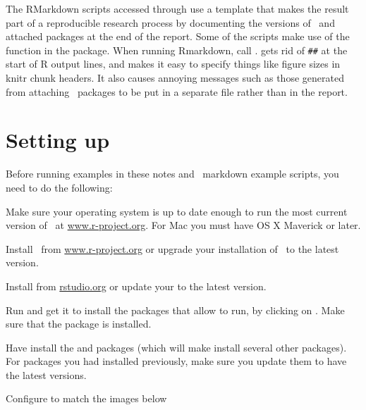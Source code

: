 The RMarkdown scripts accessed through  use a template that makes the
result part of 
a reproducible research process by documenting the versions of \R\ and
attached packages at the end of the report.  Some of the scripts make use of the
 function in the  package. When running
Rmarkdown, call .   gets
rid of \verb|##| at 
the start of R output lines, and makes it easy to specify things like
figure sizes in knitr chunk headers. It also causes annoying messages
such as those generated from attaching \R\ packages to be put in a
separate file  rather than in the report.

\section{Setting up \R}
Before running examples in these notes and \R\ markdown example
scripts, you need to do the following:
\be
\item Make sure your operating system is up to date enough to run the
  most current version of \R\ at \url{www.r-project.org}.  For Mac you
  must have OS X Maverick or later.
\item Install \R\ from \url{www.r-project.org} or upgrade your
  installation of \R\ to the latest version.
\item Install  from \url{rstudio.org} or update your
   to the latest version.
\item Run  and get it to install the packages that allow
   to run, by clicking on .  Make sure that the  package is installed.
\item Have  install the  and  packages
  (which will make  install several other packages).  For
  packages you had installed previously, make sure you update them to
  have the latest versions.
\item Configure   to match
  the images below
  
